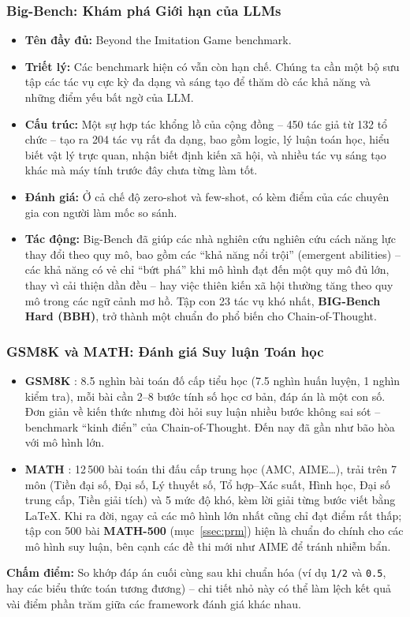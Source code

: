 \subsubsection{Big-Bench: Khám phá Giới hạn của LLMs}
\begin{itemize}
    \item \textbf{Tên đầy đủ:} Beyond the Imitation Game benchmark.
    \item \textbf{Triết lý:} Các benchmark hiện có vẫn còn hạn chế. Chúng ta cần một bộ sưu tập các tác vụ cực kỳ đa dạng và sáng tạo để thăm dò các khả năng và những điểm yếu bất ngờ của LLM.
    \item \textbf{Cấu trúc:} Một sự hợp tác khổng lồ của cộng đồng \cite{srivastava2023bigbench} -- 450 tác giả từ 132 tổ chức -- tạo ra 204 tác vụ rất đa dạng, bao gồm logic, lý luận toán học, hiểu biết vật lý trực quan, nhận biết định kiến xã hội, và nhiều tác vụ sáng tạo khác mà máy tính trước đây chưa từng làm tốt.
    \item \textbf{Đánh giá:} Ở cả chế độ zero-shot và few-shot, có kèm điểm của các chuyên gia con người làm mốc so sánh.
    \item \textbf{Tác động:} Big-Bench đã giúp các nhà nghiên cứu nghiên cứu cách năng lực thay đổi theo quy mô, bao gồm các “khả năng nổi trội” (emergent abilities) -- các khả năng có vẻ chỉ “bứt phá” khi mô hình đạt đến một quy mô đủ lớn, thay vì cải thiện dần đều -- hay việc thiên kiến xã hội thường tăng theo quy mô trong các ngữ cảnh mơ hồ. Tập con 23 tác vụ khó nhất, \textbf{BIG-Bench Hard (BBH)}, trở thành một chuẩn đo phổ biến cho Chain-of-Thought.
\end{itemize}

\subsubsection{GSM8K và MATH: Đánh giá Suy luận Toán học \newtag}
\label{sssec:gsm8k_math}
\begin{itemize}
	\item \textbf{GSM8K} \cite{cobbe2021gsm8k}: 8.5 nghìn bài toán đố cấp tiểu học (7.5 nghìn huấn luyện, 1 nghìn kiểm tra), mỗi bài cần 2--8 bước tính số học cơ bản, đáp án là một con số. Đơn giản về kiến thức nhưng đòi hỏi suy luận nhiều bước không sai sót -- benchmark “kinh điển” của Chain-of-Thought. Đến nay đã gần như bão hòa với mô hình lớn.
	\item \textbf{MATH} \cite{hendrycks2021math}: 12\,500 bài toán thi đấu cấp trung học (AMC, AIME\ldots), trải trên 7 môn (Tiền đại số, Đại số, Lý thuyết số, Tổ hợp--Xác suất, Hình học, Đại số trung cấp, Tiền giải tích) và 5 mức độ khó, kèm lời giải từng bước viết bằng \LaTeX. Khi ra đời, ngay cả các mô hình lớn nhất cũng chỉ đạt điểm rất thấp; tập con 500 bài \textbf{MATH-500} (mục~\ref{ssec:prm}) hiện là chuẩn đo chính cho các mô hình suy luận, bên cạnh các đề thi mới như AIME để tránh nhiễm bẩn.
\end{itemize}
\textbf{Chấm điểm:} So khớp đáp án cuối cùng sau khi chuẩn hóa (ví dụ \texttt{1/2} và \texttt{0.5}, hay các biểu thức toán tương đương) -- chi tiết nhỏ này có thể làm lệch kết quả vài điểm phần trăm giữa các framework đánh giá khác nhau.

